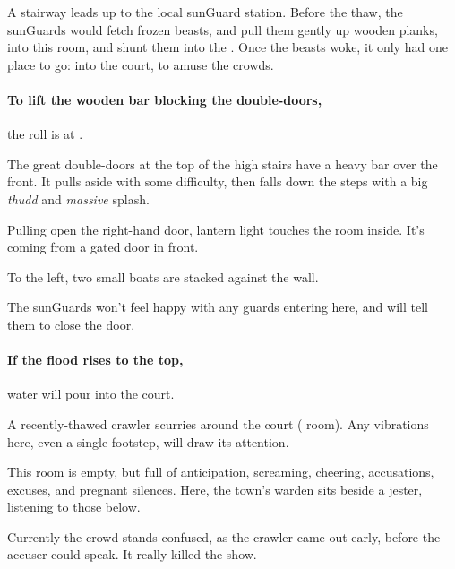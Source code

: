\begin{multicols}{2}


\begin{exampletext}
  A stairway leads up to the local \gls{sunGuard} station.
  Before the thaw, the \glspl{sunGuard} would fetch frozen beasts, and pull them gently up wooden planks, into this room, and shunt them into the .
  Once the beasts woke, it only had one place to go: into the \gls{court}, to amuse the crowds.
\end{exampletext}

\paragraph{To lift the wooden bar blocking the double-doors,}
the roll is  at \tn[7].

\begin{boxtext}
  The great double-doors at the top of the high stairs have a heavy bar over the front.
  It pulls aside with some difficulty, then falls down the steps with a big \emph{thudd} and \emph{massive} splash.

  Pulling open the right-hand door, lantern light touches the room inside.
  It's coming from a gated door in front.

  To the left, two small boats are stacked against the wall.
\end{boxtext}

The \glspl{sunGuard} won't feel happy with any \glspl{guard} entering here, and will tell them to close the door.

\paragraph{If the flood rises to the top,}
water will pour into the \gls{court}.


A recently-thawed \gls{crawler} scurries around the \gls{court} ( room).
Any vibrations here, even a single footstep, will draw its attention.


\begin{exampletext}
  This room is empty, but full of anticipation, screaming, cheering, accusations, excuses, and pregnant silences.
  Here, the town's \gls{warden} sits beside a jester, listening to those below.
\end{exampletext}

Currently the crowd stands confused, as the \gls{crawler} came out early, before the accuser could speak.
It really killed the show.

\chitincrawler

\end{multicols}
